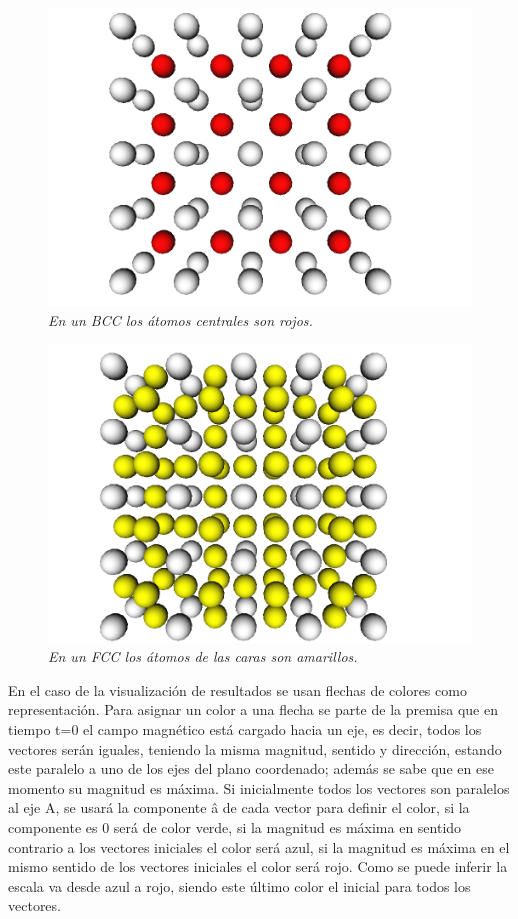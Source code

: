 \begin{figure}[H]
  \centering
  \includegraphics[scale=.3]{images/atomCanvas-BCC}
  \caption{\em En un BCC los átomos centrales son rojos.}
\end{figure}

\begin{figure}[H]
  \centering
  \includegraphics[scale=.35]{images/atomCanvas-FCC}
  \caption{\em En un FCC los átomos de las caras son amarillos.}
\end{figure}

En el caso de la visualización de resultados se usan flechas de colores como representación. Para asignar un color a una flecha se parte de la premisa que en tiempo t=0 el campo magnético está cargado hacia un eje, es decir, todos los vectores serán iguales, teniendo la misma magnitud, sentido y dirección, estando este paralelo a uno de los ejes del plano coordenado; además se sabe que en ese momento su magnitud es máxima. Si inicialmente todos los vectores son paralelos al eje A, se usará la componente â de cada vector para definir el color, si la componente es 0 será de color verde, si la magnitud es máxima en sentido contrario a los vectores iniciales el color será azul, si la magnitud es máxima en el mismo sentido de los vectores iniciales el color será rojo. Como se puede inferir la escala va desde azul a rojo, siendo este último color el inicial para todos los vectores.

